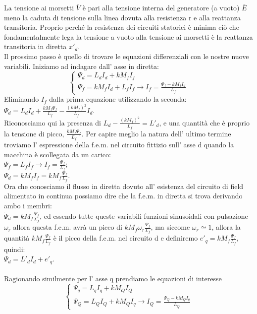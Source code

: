 \documentclass[Lau,noexaminfo]{sapthesis}
\begin{document}
	La tensione ai morsetti $\bar{V}$ è pari alla tensione interna del generatore (a vuoto) $\bar{E}$ meno la caduta di tensione sulla linea dovuta alla resistenza r e alla reattanza transitoria. Proprio perché la resistenza dei circuiti statorici è minima ciò che fondamentalmente lega la tensione a vuoto alla tensione ai morsetti è la reattanza transitoria in diretta $x'_d$.\\
	Il prossimo passo è quello di trovare le equazioni differenziali con le nostre nuove variabili. Iniziamo ad indagare dall' asse in diretta:\\
	\[
	\begin{cases}
	\Psi_d=L_dI_d+kM_fI_f\\
	\Psi_f=kM_fI_d+L_fI_f \rightarrow I_f=\frac{\Psi_f-kM_fI_d}{L_f}
	\end{cases}
	\]
	Eliminando $I_f$ dalla prima equazione utilizzando la seconda:\\
	$\Psi_d=L_dI_d+\frac{kM_f\Psi_f}{L_f}-\frac{(kM_f)^2}{L_f}I_d$.\\
	Riconosciamo qui la presenza di $L_d-\frac{(kM_f)^2}{L_f}=L'_d$, e una quantità che è proprio la tensione di picco, $\frac{kM_f\Psi_f}{L_f}$. Per capire meglio la natura dell' ultimo termine troviamo l' espressione della f.e.m. nel circuito fittizio sull' asse d quando la macchina è scollegata da un carico:\\
	$\Psi_f=L_fI_f \rightarrow I_f=\frac{\Psi_f}{L_f}$;\\
	$\Psi_d=kM_fI_f=kM_f\frac{\Psi_f}{L_f}$.\\Ora che conosciamo il flusso in diretta dovuto all' esistenza del circuito di field alimentato in continua possiamo dire che la f.e.m. in diretta si trova derivando ambo i membri:\\
	$\dot{\Psi}_d=kM_f\frac{\dot{\Psi}_f}{L_f}$, ed essendo tutte queste variabili funzioni sinusoidali con pulsazione $\omega_r$ allora questa f.e.m. avrà un picco di $kM_f\omega_r\frac{\Psi_f}{L_f}$, ma siccome $\omega_r\simeq1$, allora la quantità $kM_f\frac{\Psi_f}{L_f}$ è il picco della f.e.m. nel circuito d e definiremo $e'_q=kM_f\frac{\Psi_f}{L_f}$, quindi:\\
	$\Psi_d=L'_dI_d+e'_q$.\\\\
	Ragionando similmente per l' asse q prendiamo le equazioni di interesse\\
	\[
	\begin{cases}
	\Psi_q=L_qI_q+kM_QI_Q\\
	\Psi_Q=L_QI_Q+kM_QI_q \rightarrow I_Q=\frac{\Psi_Q-kM_QI_q}{L_Q}
	\end{cases}
	\]
\end{document}
